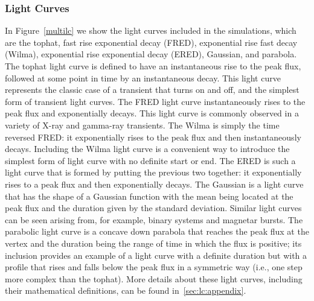 \documentclass[12pt]{article}
\begin{document}
\subsubsection{Light Curves}
In Figure~\ref{multilc} we show the light curves included in the simulations, which are the tophat, fast rise exponential decay (FRED), exponential rise fast decay (Wilma), exponential rise exponential decay (ERED), Gaussian, and parabola. The tophat light curve is defined to have an instantaneous rise to the peak flux, followed at some point in time by an instantaneous decay. This light curve represents the classic case of a transient that turns on and off, and the simplest form of transient light curves. The FRED light curve instantaneously rises to the peak flux and exponentially decays. This light curve is commonly observed in a variety of X-ray and gamma-ray transients. The Wilma is simply the time reversed FRED: it exponentially rises to the peak flux and then instantaneously decays. Including the Wilma light curve is a convenient way to introduce the simplest form of light curve with no definite start or end. The ERED is such a light curve that is formed by putting the previous two together: it exponentially rises to a peak flux and then exponentially decays. The Gaussian is a light curve that has the shape of a Gaussian function with the mean being located at the peak flux and the duration given by the standard deviation. Similar light curves can be seen arising from, for example, binary systems and magnetar bursts.  The parabolic light curve is a concave down parabola that reaches the peak flux at the vertex and the duration being the range of time in which the flux is positive; its inclusion provides an example of a light curve with a definite duration but with a profile that rises and falls below the peak flux in a symmetric way (i.e., one step more complex than the tophat). More details about these light curves, including their mathematical definitions, can be found in~\ref{sec:lc:appendix}.
\end{document}
